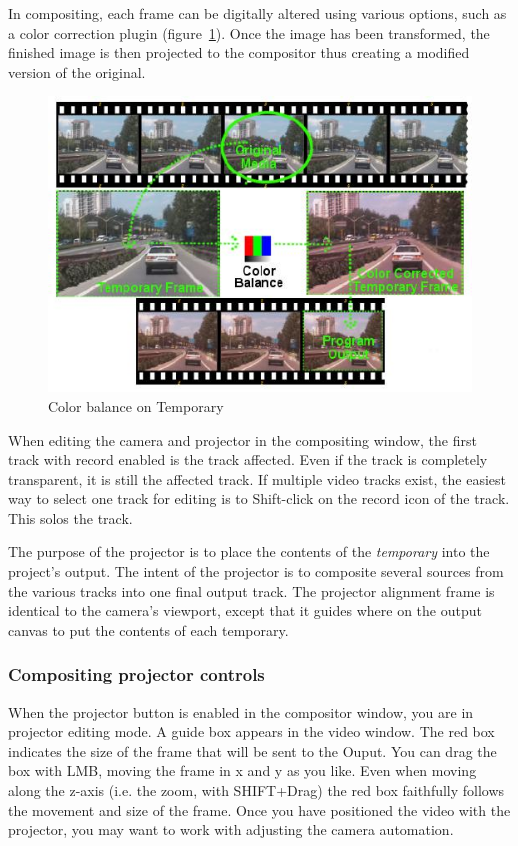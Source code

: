 In compositing, each frame can be digitally altered using various options, such as a color correction plugin (figure~\ref{fig:camera_and_projector}). 
Once the image has been transformed, the finished image is then projected to the compositor thus creating a modified version of the original.

\begin{figure}[htpb]
    \centering
    \includegraphics[width=0.8\linewidth]{images/camera_and_projector.png}
    \caption{Color balance on Temporary}
    \label{fig:camera_and_projector}
\end{figure}

When editing the camera and projector in the compositing window, the first track with record enabled is the track affected. 
Even if the track is completely transparent, it is still the affected track. 
If multiple video tracks exist, the easiest way to select one track for editing is to Shift-click on the record icon of the track. 
This solos the track.

The purpose of the projector is to place the contents of the \textit{temporary} into the project's output.  
The intent of the projector is to composite several sources from the various tracks into one final output track. 
The projector alignment frame is identical to the camera's viewport, except that it guides where on the output canvas to put the contents of each temporary.

\subsubsection*{Compositing projector controls}%
\label{ssub:compositing_projector_controls}

When the projector button is enabled in the compositor window, you are in projector editing mode. A guide box appears in the video window. The red box indicates the size of the frame that will be sent to the Ouput. You can drag the box with LMB, moving the frame in x and y as you like. Even when moving along the z-axis (i.e. the zoom, with SHIFT+Drag) the red box faithfully follows the movement and size of the frame. Once you have positioned the video with the projector, you may want to work with adjusting the camera automation.

